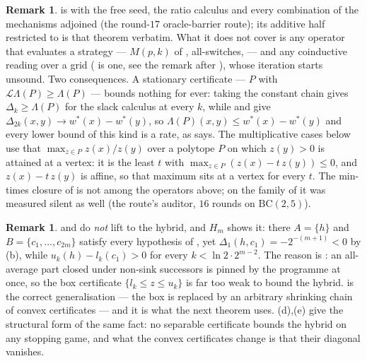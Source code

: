 \documentclass[11pt]{article}
\theoremstyle{plain}
\theoremstyle{definition}
\newtheorem{remark}[theorem]{Remark}
\begin{document}
\begin{remark}\label{rem:convex-barrier-both}
 is  with the
free seed, the ratio calculus and every combination of the mechanisms
adjoined (the round-$17$ oracle-barrier route); its additive half restricted
to  is that theorem verbatim. What it does not cover is
any operator that evaluates a strategy --- $M(p,k)$ of ,
all-switches,  --- and any coinductive reading over a grid
( is one, see the remark after ), whose
iteration starts unsound. Two consequences. A stationary certificate ---
$P$ with $\mathcal L\Lambda(P)\ge\Lambda(P)$ --- bounds nothing for ever:
taking the constant chain gives $\Delta_k\ge\Lambda(P)$ for the slack
calculus at every $k$, while  and
 give $\Delta_{2k}(x,y)\to w^\ast(x)-w^\ast(y)$, so
$\Lambda(P)(x,y)\le w^\ast(x)-w^\ast(y)$ and every lower bound of this
kind is a rate, as  says. The multiplicative cases below use that $\max_{z\in P}z(x)/z(y)$ over a
polytope $P$ on which $z(y)>0$ is attained at a vertex: it is the least
$t$ with $\max_{z\in P}(z(x)-t\,z(y))\le0$, and $z(x)-t\,z(y)$ is affine,
so that maximum sits at a vertex for every $t$. The min-times closure of
 is not among the operators above; on the family
of  it was measured silent as well (the route's auditor,
$16$ rounds on $\mathrm{BC}(2,5)$).
\end{remark}

\begin{remark}\label{rem:hybrid-barrier-lift}
 and  do \emph{not} lift to the
hybrid, and $H_m$ shows it: there $A=\{h\}$ and $B=\{c_1,\dots,c_{2m}\}$ satisfy
every hypothesis of , yet
$\Delta_1(h,c_1)=-2^{-(m+1)}<0$ by (b), while
$u_k(h)-l_k(c_1)>0$ for every $k<\ln2\cdot2^{m-2}$. The reason is
: an all-average part closed under non-sink successors
is pinned by the programme at once, so the box certificate
$\{l_k\le z\le u_k\}$ is far too weak to bound the hybrid.
 is the correct generalisation --- the box is
replaced by an arbitrary shrinking chain of convex certificates --- and it is
what the next theorem uses. (d),(e) give the structural
form of the same fact: no separable certificate bounds the hybrid on any
stopping game, and what the convex certificates change is that their
diagonal vanishes.
\end{remark}
\end{document}
